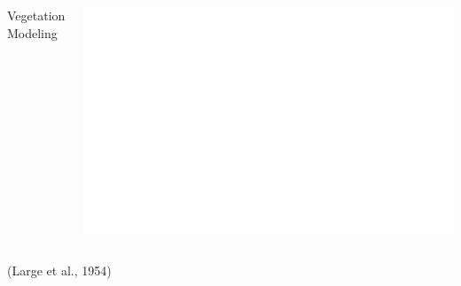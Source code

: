 %
%
%	
%			
%			
%			
%	

{
\begin{frame}[plain]

\vfill
\Huge\color{white}
\begin{center}
\begin{columns}
\vspace{7em}

\hfill 
Vegetation Modeling

\includegraphics[width=\textwidth]{images/Large1954_cerial_growth_stages_white}
\end{columns}
\small\raggedleft(Large et al., 1954)
\end{center}

\vfill
\end{frame}
}

